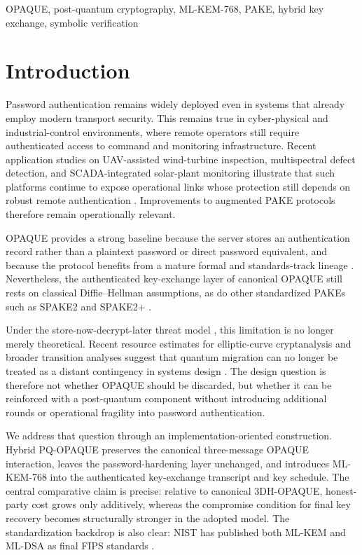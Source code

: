\documentclass[conference]{IEEEtran}
\begin{document}
\begin{IEEEkeywords}
OPAQUE, post-quantum cryptography, ML-KEM-768, PAKE, hybrid key exchange, symbolic verification
\end{IEEEkeywords}

\section{Introduction}

Password authentication remains widely deployed even in systems that already employ modern transport security. This remains true in cyber-physical and industrial-control environments, where remote operators still require authenticated access to command and monitoring infrastructure. Recent application studies on UAV-assisted wind-turbine inspection, multispectral defect detection, and SCADA-integrated solar-plant monitoring illustrate that such platforms continue to expose operational links whose protection still depends on robust remote authentication \cite{en18071823,Svystun_Melnychenko_Radiuk_Savenko_Sachenko_Lysyi_2024,reksreks.2025.2.06}. Improvements to augmented PAKE protocols therefore remain operationally relevant.

OPAQUE provides a strong baseline because the server stores an authentication record rather than a plaintext password or direct password equivalent, and because the protocol benefits from a mature formal and standards-track lineage \cite{jarecki2018,ietf-opaque}. Nevertheless, the authenticated key-exchange layer of canonical OPAQUE still rests on classical Diffie--Hellman assumptions, as do other standardized PAKEs such as SPAKE2 and SPAKE2+ \cite{ladd2023,spake2plus2023}.

Under the store-now-decrypt-later threat model \cite{mosca2018}, this limitation is no longer merely theoretical. Recent resource estimates for elliptic-curve cryptanalysis and broader transition analyses suggest that quantum migration can no longer be treated as a distant contingency in systems design \cite{shor1994,bernstein2017,roetteler2017,babbush2026}. The design question is therefore not whether OPAQUE should be discarded, but whether it can be reinforced with a post-quantum component without introducing additional rounds or operational fragility into password authentication.

We address that question through an implementation-oriented construction. Hybrid PQ-OPAQUE preserves the canonical three-message OPAQUE interaction, leaves the password-hardening layer unchanged, and introduces ML-KEM-768 into the authenticated key-exchange transcript and key schedule. The central comparative claim is precise: relative to canonical 3DH-OPAQUE, honest-party cost grows only additively, whereas the compromise condition for final key recovery becomes structurally stronger in the adopted model. The standardization backdrop is also clear: NIST has published both ML-KEM and ML-DSA as final FIPS standards \cite{fips203,fips204}.
\end{document}
